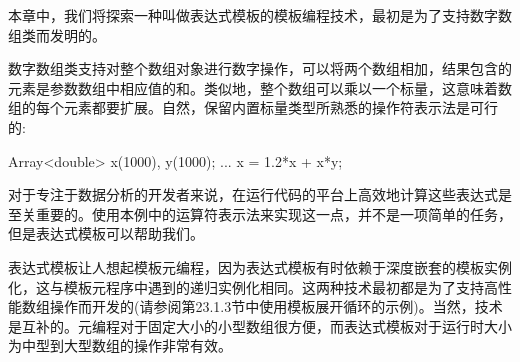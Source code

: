 本章中，我们将探索一种叫做表达式模板的模板编程技术，最初是为了支持数字数组类而发明的。

数字数组类支持对整个数组对象进行数字操作，可以将两个数组相加，结果包含的元素是参数数组中相应值的和。类似地，整个数组可以乘以一个标量，这意味着数组的每个元素都要扩展。自然，保留内置标量类型所熟悉的操作符表示法是可行的:

\begin{cpp}
Array<double> x(1000), y(1000);
...
x = 1.2*x + x*y;
\end{cpp}

对于专注于数据分析的开发者来说，在运行代码的平台上高效地计算这些表达式是至关重要的。使用本例中的运算符表示法来实现这一点，并不是一项简单的任务，但是表达式模板可以帮助我们。

表达式模板让人想起模板元编程，因为表达式模板有时依赖于深度嵌套的模板实例化，这与模板元程序中遇到的递归实例化相同。这两种技术最初都是为了支持高性能数组操作而开发的(请参阅第23.1.3节中使用模板展开循环的示例)。当然，技术是互补的。元编程对于固定大小的小型数组很方便，而表达式模板对于运行时大小为中型到大型数组的操作非常有效。









































